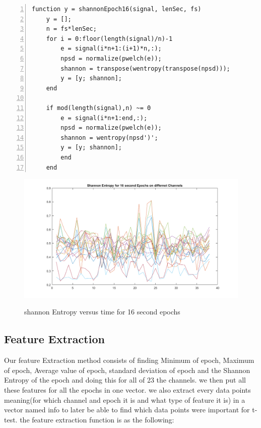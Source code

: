\documentclass[11pt]{article}
\begin{document}
\begin{lstlisting}[backgroundcolor=\color{lbcolor}, frame=single,
    numbers=left,style=Matlab-editor]
    function y = shannonEpoch16(signal, lenSec, fs)
    y = [];
    n = fs*lenSec;
    for i = 0:floor(length(signal)/n)-1
        e = signal(i*n+1:(i+1)*n,:);
        npsd = normalize(pwelch(e));
        shannon = transpose(wentropy(transpose(npsd)));
        y = [y; shannon];
    end

    if mod(length(signal),n) ~= 0
        e = signal(i*n+1:end,:);
        npsd = normalize(pwelch(e));
        shannon = wentropy(npsd')';
        y = [y; shannon];
        end
    end
\end{lstlisting}

\begin{figure}[H]
    \begin{center}
        \includegraphics[scale=0.6]{Fig/Entropy.png}
        \label{fig:shannonEntropy}
        \caption{shannon Entropy versus time for 16 second epochs}
    \end{center}
\end{figure}

\subsection{Feature Extraction}
Our feature Extraction method consists of finding Minimum of epoch, Maximum
of epoch, Average value of epoch, standard deviation of epoch and the Shannon Entropy
of the epoch and doing this for all of 23 the channels. we then put all these features for
all the epochs in one vector. we also extract every data points meaning(for which channel and epoch
it is and what type of feature it is) in a vector named info to later be able to find which
data points were important for t-test. the feature extraction function is as the following: \\
\end{document}
